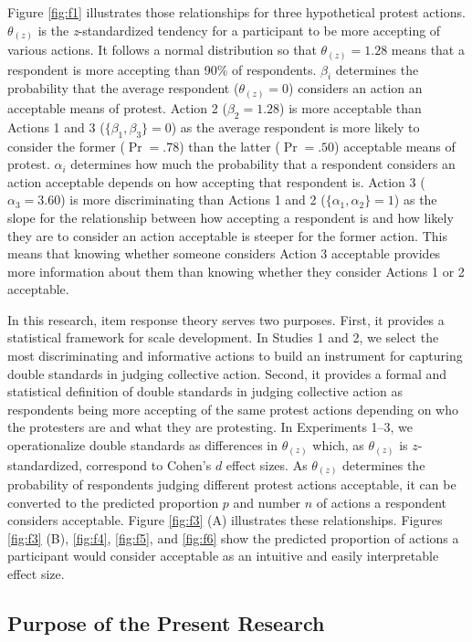 \documentclass[12pt, letterpaper]{article}
\begin{document}
Figure \ref{fig:f1} illustrates those relationships for three
hypothetical protest actions. \(\theta_{(z)}\) is the
\emph{z}-standardized tendency for a participant to be more accepting of
various actions. It follows a normal distribution so that
\(\theta_{(z)} = 1.28\) means that a respondent is more accepting than
90\% of respondents. \(\beta_i\) determines the probability that the
average respondent (\(\theta_{(z)} = 0\)) considers an action an
acceptable means of protest. Action 2 (\(\beta_2 = 1.28\)) is more
acceptable than Actions 1 and 3 (\(\{ \beta_1, \beta_3 \} = 0\)) as the
average respondent is more likely to consider the former (\(\Pr = .78\))
than the latter (\(\Pr = .50\)) acceptable means of protest.
\(\alpha_i\) determines how much the probability that a respondent
considers an action acceptable depends on how accepting that respondent
is. Action 3 (\(\alpha_3 = 3.60\)) is more discriminating than Actions 1
and 2 (\(\{ \alpha_1, \alpha_2 \} = 1\)) as the slope for the
relationship between how accepting a respondent is and how likely they
are to consider an action acceptable is steeper for the former action.
This means that knowing whether someone considers Action 3 acceptable
provides more information about them than knowing whether they consider
Actions 1 or 2 acceptable.

In this research, item response theory serves two purposes. First, it
provides a statistical framework for scale development. In Studies 1 and
2, we select the most discriminating and informative actions to build an
instrument for capturing double standards in judging collective action.
Second, it provides a formal and statistical definition of double
standards in judging collective action as respondents being more
accepting of the same protest actions depending on who the protesters
are and what they are protesting. In Experiments 1--3, we operationalize
double standards as differences in \(\theta_{(z)}\) which, as
\(\theta_{(z)}\) is \(z\)-standardized, correspond to Cohen's \(d\)
effect sizes. As \(\theta_{(z)}\) determines the probability of
respondents judging different protest actions acceptable, it can be
converted to the predicted proportion \(p\) and number \(n\) of actions
a respondent considers acceptable. Figure \ref{fig:f3} (A) illustrates
these relationships. Figures \ref{fig:f3} (B), \ref{fig:f4},
\ref{fig:f5}, and \ref{fig:f6} show the predicted proportion of actions
a participant would consider acceptable as an intuitive and easily
interpretable effect size.

\hypertarget{purpose-of-the-present-research}{%
\subsection{Purpose of the Present
Research}\label{purpose-of-the-present-research}}
\end{document}

